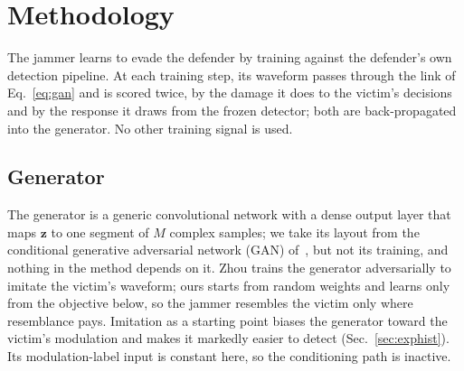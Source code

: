 \section{Methodology}
\label{sec:method}
The jammer learns to evade the defender by training against the defender's own detection pipeline.
At each training step, its waveform passes through the link of Eq.~\eqref{eq:gan} and is scored twice, by the damage it does to the victim's decisions and by the response it draws from the frozen detector; both are back-propagated into the generator.
No other training signal is used.

\subsection{Generator}
\label{sec:method:plain}
The generator is a generic convolutional network with a dense output layer that maps $\mathbf{z}$ to one segment of $M$ complex samples; we take its layout from the conditional generative adversarial network (GAN) of~\cite{zhou2025cgan}, but not its training, and nothing in the method depends on it.
Zhou trains the generator adversarially to imitate the victim's waveform; ours starts from random weights and learns only from the objective below, so the jammer resembles the victim only where resemblance pays.
Imitation as a starting point biases the generator toward the victim's modulation and makes it markedly easier to detect (Sec.~\ref{sec:exphist}).
Its modulation-label input is constant here, so the conditioning path is inactive.

